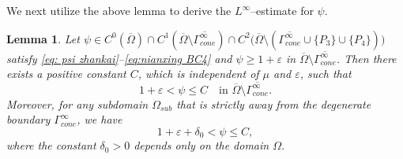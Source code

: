 \documentclass[reqno,12pt]{amsart}
\newtheorem{lemma}{Lemma}[section]
\numberwithin{equation}{section}
\begin{document}
We next utilize the above lemma to derive the $L^\infty$--estimate for $\psi$.
\begin{lemma}\label{lemma: inf-estimate}
	Let $\psi \in C^{0}(\overline{\Omega})\cap C^{1}(\overline{\Omega}\setminus\overline{\Gamma_{cone}^{\infty}})\cap C^2\big(\overline{\Omega}\setminus(\overline{\Gamma_{cone}^{\infty}}\cup\{P_3\}\cup\{P_4\})\big)$ satisfy \eqref{eq: psi zhankai}--\eqref{eq:nianxing BC4} and $\psi\geq 1+\varepsilon$ in $\overline{\Omega}\setminus\overline{\Gamma_{cone}^{\infty}}$. Then there exists a positive constant $C$, which is independent of $\mu$ and $\varepsilon$, such that
	\begin{equation}\label{eq1:3.13}
		1+\varepsilon<{\psi}\leq C\quad\text{in $\overline{\Omega}\setminus\overline{\Gamma_{cone}^{\infty}}$}.
	\end{equation}
    Moreover, for any subdomain $\Omega_{sub}$ that is strictly away from the degenerate boundary $\Gamma_{cone}^{\infty}$, we have
        \begin{equation}\label{eq:strictly bounded}
		1+\varepsilon+\delta_0<{\psi}\leq C,
	\end{equation}
    where the constant $\delta_0>0$ depends only on the domain $\Omega$. 
\end{lemma}
\end{document}
